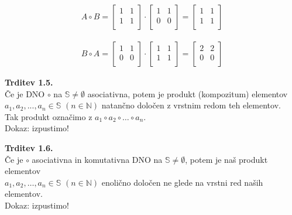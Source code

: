 \documentclass[12pt]{article}
\begin{document}
\begin{align*}
    A \circ B = 
    \begin{bmatrix}
        1 & 1 \\
        1 & 1 \\
    \end{bmatrix} \cdot 
    \begin{bmatrix}
        1 & 1 \\
        0 & 0 \\
    \end{bmatrix}
    = 
    \begin{bmatrix}
        1 & 1 \\
        1 & 1 \\
    \end{bmatrix}
\end{align*}

\begin{align*}
    B \circ A = 
    \begin{bmatrix}
        1 & 1 \\
        0 & 0 \\
    \end{bmatrix} \cdot 
    \begin{bmatrix}
        1 & 1 \\
        1 & 1 \\
    \end{bmatrix} =
    \begin{bmatrix}
        2 & 2 \\
        0 & 0 \\
    \end{bmatrix}
\end{align*}



\vspace*{24pt}


\noindent
\textbf{Trditev 1.5.} \\
Če je DNO $\circ$ na $\mathbb{S} \ne \emptyset$ asociativna, potem je produkt (kompozitum) elementov \\
$a_1, a_2, ..., a_n \in \mathbb{S}$ $(n \in \mathbb{N})$ natančno določen z vrstnim redom teh elementov. \\
Tak produkt označimo z $a_1 \circ a_2 \circ \dots \circ a_n$. \\
Dokaz: izpustimo!




\vspace*{24pt}


\noindent
\textbf{Trditev 1.6.} \\
Če je $\circ$ asociativna in komutativna DNO na $\mathbb{S} \ne \emptyset$, potem je naš produkt elementov \\
$a_1, a_2, \dots, a_n \in \mathbb{S}$ $(n \in \mathbb{N})$ enolično določen ne glede na vrstni red naših elementov. \\
Dokaz: izpustimo!
\end{document}
